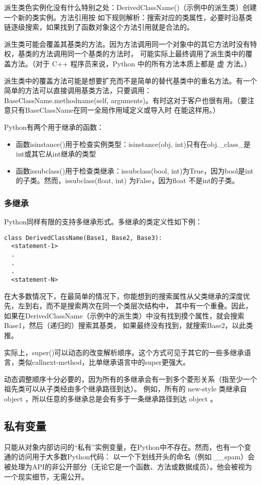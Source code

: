 \documentclass[UTF8]{ctexart}
\begin{document}
派生类色实例化没有什么特别之处：DerivedClassName()（示例中的派生类）创建一个新的类实例。方法引用按
如下规则解析：搜索对应的类属性，必要时沿基类链逐级搜索，如果找到了函数对象这个方法引用就是合法的。

派生类可能会覆盖其基类的方法。因为方法调用同一个对象中的其它方法时没有特权，基类的方法调用同一个基类的方法时，
可能实际上最终调用了派生类中的覆盖方法。（对于 C++ 程序员来说，Python 中的所有方法本质上都是 虚 方法。）

派生类中的覆盖方法可能是想要扩充而不是简单的替代基类中的重名方法。有一个简单的方法可以直接调用基类方法，只要调用：
BaseClassName.methodname(self, arguments)。有时这对于客户也很有用。（要注意只有BaseClassName在同一全局作用域定义或导入时
在能这样用。）

Python有两个用于继承的函数：
\begin{itemize}
  \item 函数isinstance()用于检查实例类型：isinstance(obj, int)只有在obj.\_class\_是int或其它从int继承的类型
  \item 函数issubclass()用于检查类继承：issubclass(bool, int)为True，因为bool是int的子类。然而，issubclass(float, int)
  为False，因为float 不是int的子类。
\end{itemize}

\subsubsection{多继承}
Python同样有限的支持多继承形式。多继承的类定义性如下例：
\begin{verbatim}
class DerivedClassName(Base1, Base2, Base3):
  <statement-1>
  .
  .
  .
  <statement-N>
\end{verbatim}

在大多数情况下，在最简单的情况下，你能想到的搜索属性从父类继承的深度优先，左到右，而不是搜索两次在同一个类层次结构中，
其中有一个重叠。因此，如果在DerivedClassName（示例中的派生类）中没有找到摸个属性，就会搜索Base1，然后（递归的）搜索其基类，
如果最终没有找到，就搜索Base2，以此类推。

实际上，super()可以动态的改变解析顺序。这个方式可见于其它的一些多继承语言，类似call\-next-method，比单继承语言中的super更强大。

动态调整顺序十分必要的，因为所有的多继承会有一到多个菱形关系（指至少一个祖先类可以从子类经由多个继承路径到达）。
例如，所有的 new-style 类继承自 object ，所以任意的多继承总是会有多于一条继承路径到达 object 。

\subsection{私有变量}
只能从对象内部访问的``私有''实例变量，在Python中不存在。然而，也有一个变通的访问用于大多数Python代码：
以一个下划线开头的命名（例如 \_\_spam）会被处理为API的非公开部分（无论它是一个函数、方法或数据成员）。他会被视为一个现实细节，无需公开。
\end{document}
